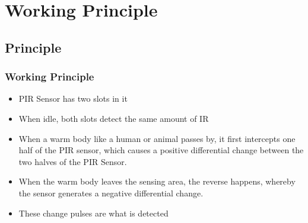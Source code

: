 \documentclass[table,10pt,red]{beamer}	%
\begin{document}

\section{Working Principle} 
\subsection{Principle}
 \begin{frame}
	\frametitle{Working Principle}
\pause
		\begin{itemize}
\justifying
\item <+-|alert@+>  PIR Sensor has two slots in it
\item <+-|alert@+> When idle, both slots detect the same amount of IR 
\item <+-|alert@+> When a warm body like a human or animal passes by, it first intercepts one half of the PIR sensor, which causes a positive differential change between the two halves of the PIR Sensor.
\item <+-|alert@+> When the warm body leaves the sensing area, the reverse happens, whereby the sensor generates a negative differential change.
\item <+-|alert@+> These change pulses are what is detected
\end{itemize}
		

\end{frame}
\end{document}
